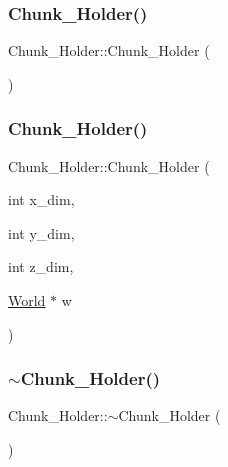 \subsubsection{\texorpdfstring{Chunk\+\_\+\+Holder()}{Chunk\_Holder()}\hspace{0.1cm}{\footnotesize\ttfamily [1/2]}}
{\footnotesize\ttfamily Chunk\+\_\+\+Holder\+::\+Chunk\+\_\+\+Holder (\begin{DoxyParamCaption}{ }\end{DoxyParamCaption})}

\mbox{\label{classChunk__Holder_ab845ac52de9aacae0ea0774ecc531ae9}} 
\subsubsection{\texorpdfstring{Chunk\+\_\+\+Holder()}{Chunk\_Holder()}\hspace{0.1cm}{\footnotesize\ttfamily [2/2]}}
{\footnotesize\ttfamily Chunk\+\_\+\+Holder\+::\+Chunk\+\_\+\+Holder (\begin{DoxyParamCaption}\item[{int}]{x\+\_\+dim,  }\item[{int}]{y\+\_\+dim,  }\item[{int}]{z\+\_\+dim,  }\item[{\mbox{\hyperlink{classWorld}{World}} $\ast$}]{w }\end{DoxyParamCaption})}

\mbox{\label{classChunk__Holder_a7375802ba42f6851efa425bcdbbfe4c2}} 
\subsubsection{\texorpdfstring{$\sim$\+Chunk\+\_\+\+Holder()}{~Chunk\_Holder()}}
{\footnotesize\ttfamily Chunk\+\_\+\+Holder\+::$\sim$\+Chunk\+\_\+\+Holder (\begin{DoxyParamCaption}{ }\end{DoxyParamCaption})}



